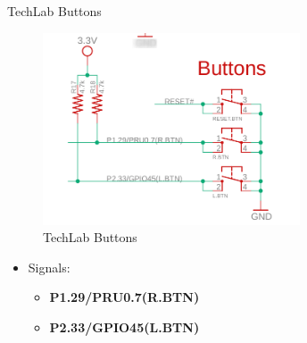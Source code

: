 \begin{frame}
	{TechLab Buttons}
	     \begin{figure}[H]
		     \includegraphics[width=3in]{IMAGES/techlab-buttons}
				       \caption{TechLab Buttons}
	     \end{figure}
	     \begin{itemize}
		     \item
		Signals:
	\begin{itemize}
		\item
			\textbf{P1.29/PRU0.7(R.BTN)}
		\item
			\textbf{P2.33/GPIO45(L.BTN)}
	\end{itemize}
	\end{itemize}
\end{frame}
